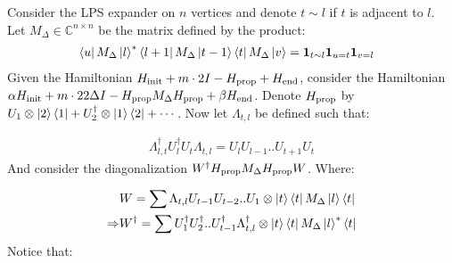 \documentclass[manuscript,screen,review]{acmart}
\begin{document}
%
%

Consider the LPS expander on $n$ vertices and denote $t \sim l$ if $t$ is adjacent to $l$. Let $M_\Delta \in \mathbb{C}^{n \times n}$ be the matrix defined by the product:  
\begin{equation*}
  \begin{split}
    &\bra{u}M_{\Delta}\ket{l}^{*}\bra{l+1}M_{\Delta}\ket{t-1} \bra{t} M_{\Delta}\ket{v} = \mathbf{1}_{ t \sim l } \mathbf{1}_{u = t} \mathbf{1}_{v = l } 
  \end{split}
\end{equation*}
Given the Hamiltonian $H_{\text{init}} + m \cdot 2I - H_{\text{prop}} + H_{\text{end}}$, consider the Hamiltonian $\alpha H_{\text{init}} + m \cdot 22\Delta I - H_{\text{prop}} M_\Delta H_{\text{prop}} + \beta H_{\text{end}}$. Denote $H_{\text{prop}}$ by $U_{1} \otimes \ket{2}\bra{1}  + U_{2}^{\dagger} \otimes \ket{1}\bra{2} + \cdots $.
Now let $\Lambda_{t,l}$ be defined such that:
 
 \begin{equation*}
   \begin{split}
     \Lambda^{\dagger}_{l,t} U_{l}^{\dagger}U_{t} \Lambda_{t,l} = U_{l}U_{l-1}..U_{t+1}U_{t}
   \end{split}
 \end{equation*}
And consider the diagonalization $W^{\dagger}H_{\text{prop}} M_{\Delta} H_{\text{prop}} W$. Where:

\begin{equation*}
  \begin{split}
    & W = \sum\Lambda_{t,l}U_{t-1}U_{t-2}..U_{1} \otimes \ket{t}\bra{t} M_{\Delta}\ket{l}\bra{t} \\ 
    \Rightarrow & W^{\dagger} = \sum U_{1}^{\dagger}U_{2}^{\dagger} .. U_{t-1}^{\dagger} \Lambda_{t,l}^{\dagger} \otimes \ket{t}\bra{t} M_{\Delta}\ket{l}^{*}\bra{t} 
  \end{split}
\end{equation*}
Notice that: 
\end{document}
